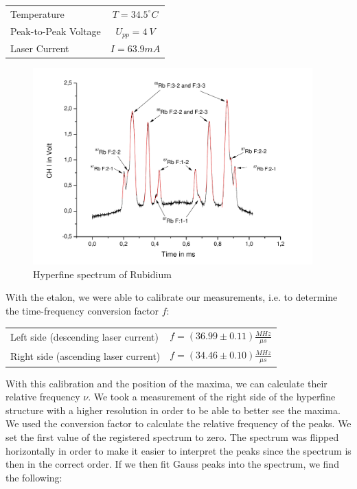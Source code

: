 \begin{center}
\begin{tabular}[H]{l c}
Temperature & $T=34.5 ^\circ C$\\
Peak-to-Peak Voltage & $U_{pp} = 4\ V$\\
Laser Current & $I = 63.9 mA$\\
\end{tabular}
\end{center}

\begin{figure}[H]
\centering \includegraphics[width=0.96\textwidth]{BilderAusw/HFS.pdf}
\caption{Hyperfine spectrum of Rubidium}
\end{figure}

With the etalon, we were able to calibrate our measurements, i.e. to determine the time-frequency conversion factor $f$:

\begin{center}
\begin{tabular}[H]{l l}
Left side (descending laser current) & $f = (36.99 \pm 0.11) \frac{MHz}{\mu s}$\\
Right side (ascending laser current) &  $ f = (34.46 \pm 0.10) \frac{MHz}{\mu s}$\\ 
\end{tabular}
\end{center}


With this calibration and the position of the maxima, we can calculate their relative frequency $\nu$. We took a measurement of the right side of the hyperfine structure with a higher resolution in order to be able to better see the maxima. We used the conversion factor to calculate the relative frequency of the peaks. We set the first value of the registered spectrum to zero. The spectrum was flipped horizontally in order to make it easier to interpret the peaks since the spectrum is then in the correct order. If we then fit Gauss peaks into the spectrum, we find the following:

